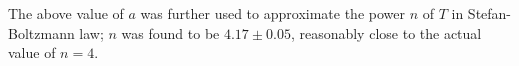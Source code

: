 \begin{paper}
		The above value of \( a \) was further used to approximate the power \( n \) of \( T \) in Stefan-Boltzmann law; \( n \) was found to be \( 4.17 \pm 0.05 \), reasonably close to the actual value of \( n = 4 \). 



\papersource{}

\end{paper}

